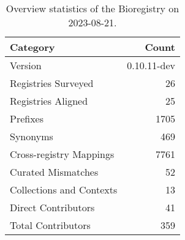 \begin{table}
\caption{Overview statistics of the Bioregistry on 2023-08-21.}
\label{tab:bioregistry-summary}
\begin{tabular}{lr}
\toprule
Category & Count \\
\midrule
Version & 0.10.11-dev \\
Registries Surveyed & 26 \\
Registries Aligned & 25 \\
Prefixes & 1705 \\
Synonyms & 469 \\
Cross-registry Mappings & 7761 \\
Curated Mismatches & 52 \\
Collections and Contexts & 13 \\
Direct Contributors & 41 \\
Total Contributors & 359 \\
\bottomrule
\end{tabular}
\end{table}

